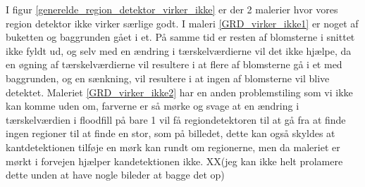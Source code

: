 I figur \ref{generelde_region_detektor_virker_ikke} er der 2 malerier
hvor vores region detektor ikke virker særlige godt. I maleri
\ref{GRD_virker_ikke1} er noget af buketten og baggrunden gået i et. På
samme tid er resten af blomsterne i snittet ikke fyldt ud, og selv med
en ændring i tærskelværdierne vil det ikke hjælpe, da en øgning af
tærskelværdierne vil resultere i at flere af blomsterne gå i et med
baggrunden, og en sænkning, vil resultere i at ingen af blomsterne vil
blive detektet. Maleriet \ref{GRD_virker_ikke2} har en anden
problemstiling som vi ikke kan komme uden om, farverne er så mørke og
svage at en ændring i tærskelværdien i floodfill på bare 1 vil få
regiondetektoren til at gå fra at finde ingen regioner til at finde en
stor, som på billedet, dette kan også skyldes at kantdetektionen
tilføje en mørk kan rundt om regionerne, men da maleriet er mørkt i
forvejen hjælper kandetektionen ikke.
XX(jeg kan ikke helt prolamere dette unden at have nogle bileder at bagge det op)

